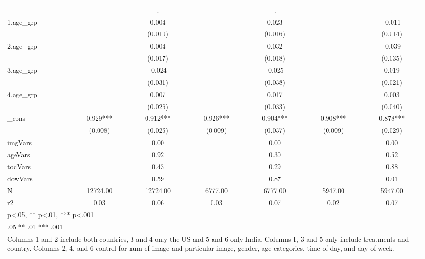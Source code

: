 {\begin{tabular}{l*{6}{c}}
            &               &           .   &               &           .   &               &           .   \\
[1em]
1.age\_grp   &               &       0.004   &               &       0.023   &               &      -0.011   \\
            &               &     (0.010)   &               &     (0.016)   &               &     (0.014)   \\
[1em]
2.age\_grp   &               &       0.004   &               &       0.032   &               &      -0.039   \\
            &               &     (0.017)   &               &     (0.018)   &               &     (0.035)   \\
[1em]
3.age\_grp   &               &      -0.024   &               &      -0.025   &               &       0.019   \\
            &               &     (0.031)   &               &     (0.038)   &               &     (0.021)   \\
[1em]
4.age\_grp   &               &       0.007   &               &       0.017   &               &       0.003   \\
            &               &     (0.026)   &               &     (0.033)   &               &     (0.040)   \\
[1em]
\_cons      &       0.929***&       0.912***&       0.926***&       0.904***&       0.908***&       0.878***\\
            &     (0.008)   &     (0.025)   &     (0.009)   &     (0.037)   &     (0.009)   &     (0.029)   \\
\hline
imgVars     &               &        0.00   &               &        0.00   &               &        0.00   \\
ageVars     &               &        0.92   &               &        0.30   &               &        0.52   \\
todVars     &               &        0.43   &               &        0.29   &               &        0.88   \\
dowVars     &               &        0.59   &               &        0.87   &               &        0.01   \\
N           &    12724.00   &    12724.00   &     6777.00   &     6777.00   &     5947.00   &     5947.00   \\
r2          &        0.03   &        0.06   &        0.03   &        0.07   &        0.02   &        0.07   \\
\hline\hline
\multicolumn{7}{l}{\footnotesize * p<.05, ** p<.01, *** p<.001}\\
\multicolumn{7}{l}{\footnotesize * .05 ** .01 *** .001}\\
\multicolumn{7}{l}{\footnotesize Columns 1 and 2 include both countries, 3 and 4 only the US and 5 and 6 only India. Columns 1, 3 and 5 only include treatments and country. Columns 2, 4, and 6 control for num of image and particular image, gender, age categories, time of day, and day of week.}\\
\end{tabular}
}
